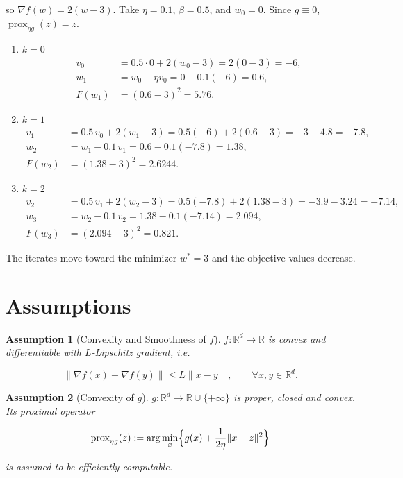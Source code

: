 \documentclass{article}
\newtheorem{assumption}{Assumption}
\newcommand{\prox}{\operatorname{prox}}
\newcommand{\R}{\mathbb{R}}
\begin{document}
so $\nabla f(w)=2(w-3)$.  
Take $\eta=0.1$, $\beta=0.5$, and $w_{0}=0$.  
Since $g\equiv0$, $\prox_{\eta g}(z)=z$.

\begin{enumerate}[label=Iteration \arabic*:, leftmargin=*]
\item $k=0$
\[
\begin{aligned}
v_{0}&=0.5\cdot0+2(w_{0}-3)=2(0-3)=-6,\\
w_{1}&=w_{0}-\eta v_{0}=0-0.1(-6)=0.6,\\
F(w_{1})&=(0.6-3)^{2}=5.76.
\end{aligned}
\]

\item $k=1$
\[
\begin{aligned}
v_{1}&=0.5\,v_{0}+2(w_{1}-3)=0.5(-6)+2(0.6-3)=-3-4.8=-7.8,\\
w_{2}&=w_{1}-0.1\,v_{1}=0.6-0.1(-7.8)=1.38,\\
F(w_{2})&=(1.38-3)^{2}=2.6244.
\end{aligned}
\]

\item $k=2$
\[
\begin{aligned}
v_{2}&=0.5\,v_{1}+2(w_{2}-3)=0.5(-7.8)+2(1.38-3)=-3.9-3.24=-7.14,\\
w_{3}&=w_{2}-0.1\,v_{2}=1.38-0.1(-7.14)=2.094,\\
F(w_{3})&=(2.094-3)^{2}=0.821.
\end{aligned}
\]
\end{enumerate}
The iterates move toward the minimizer $w^{*}=3$ and the objective values decrease.

\newpage
\section*{Assumptions}
\begin{assumption}[Convexity and Smoothness of $f$]\label{as:convexsmooth}
$f:\R^{d}\to\R$ is convex and differentiable with $L$‑Lipschitz gradient, i.e.  

\[
\|\nabla f(x)-\nabla f(y)\|\le L\|x-y\|,\qquad\forall x,y\in\R^{d}.
\] 
\end{assumption}

\begin{assumption}[Convexity of $g$]\label{as:gconvex}
$g:\R^{d}\to\R\cup\{+\infty\}$ is proper, closed and convex. Its proximal operator  

\[
\prox_{\eta g}(z):=\arg\min_{x}\Bigl\{ g(x)+\frac{1}{2\eta}\|x-z\|^{2}\Bigr\}
\]

is assumed to be efficiently computable.
\end{assumption}
\end{document}
